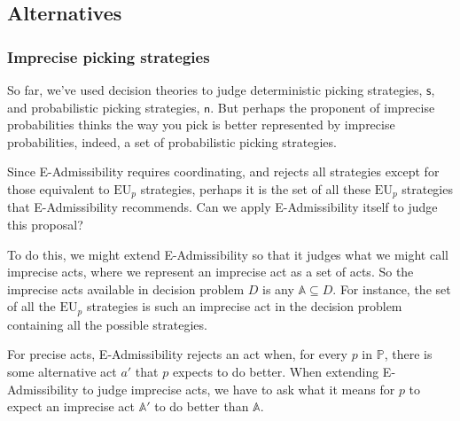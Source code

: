 \documentclass[a4paper,final]{article}
\renewcommand\P{\mathbb{P}} %
\newcommand\EU{\mathrm{EU}}
\newcommand\s{\mathsf{s}}
\renewcommand\c{\mathsf{c}} %
\newcommand{\n}{\mathsf{n}}
\newcommand{\IP}{\P}
\newenvironment{CCM rewritten}
{\begingroup\color{blue}} %
{\endgroup}              %
\begin{document}
	
	\subsection{Alternatives}
	
	\subsubsection{Imprecise picking strategies}\label{sect:IPpicking}
	So far, we've used decision theories to judge deterministic picking strategies, $\s$, and probabilistic picking strategies, $\n$. 
	But perhaps the proponent of imprecise probabilities thinks the way you pick is better represented by imprecise probabilities, indeed, a set of probabilistic picking strategies. 
	

	Since E-Admissibility requires coordinating, and rejects all strategies except for those  equivalent to $\EU_p$ strategies, perhaps it is the set of all these $\EU_p$ strategies that E-Admissibility recommends. Can we apply E-Admissibility itself to judge this proposal? 
	
	
	To do this, we might extend E-Admissibility so that it judges what we might call imprecise acts, where we represent an imprecise act as a set of acts. So the imprecise acts available in decision problem $D$ is any $\mathbb{A}\subseteq D$. For instance, the set of all the $\EU_p$ strategies is such an imprecise act in the decision problem containing all the possible strategies.

	


	For precise acts, E-Admissibility rejects an act when, for every $p$ in $\IP$, there is some alternative act $a'$ that $p$ expects to do better. When extending E-Admissibility to judge imprecise acts, we have to ask what it means for $p$ to expect an imprecise act $\mathbb{A}'$ to do better than $\mathbb{A}$. 
	
\end{document}
